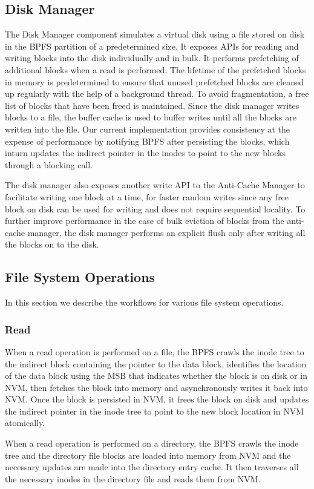 \subsection{Disk Manager}
The Disk Manager component simulates a virtual disk using a file stored on disk in the BPFS partition of a predetermined size. It exposes APIs for reading and writing blocks into the disk individually and in bulk. It performs prefetching of additional blocks when a read is performed. The lifetime of the prefetched blocks in memory is predetermined to ensure that unused prefetched blocks are cleaned up regularly with the help of a background thread. To avoid fragmentation, a free list of blocks that have been freed is maintained. Since the disk manager writes blocks to a file, the buffer cache is used to buffer writes until all the blocks are written into the file. Our current implementation provides consistency at the expense of performance by notifying BPFS after persisting the blocks, which inturn updates the indirect pointer in the inodes to point to the new blocks through a blocking call.

The disk manager also exposes another write API to the Anti-Cache Manager to facilitate writing one block at a time, for faster random writes since any free block on disk can be used for writing and does not require sequential locality. To further improve performance in the case of bulk eviction of blocks from the anti-cache manager, the disk manager performs an explicit flush only after writing all the blocks on to the disk.

\subsection{File System Operations}
In this section we describe the workflows for various file system operations.
\subsubsection{Read}
When a read operation is performed on a file, the BPFS crawls the inode tree to the indirect block containing the pointer to the data block, identifies the location of the data block using the MSB that indicates whether the block is on disk or in NVM, then fetches the block into memory and asynchronously writes it back into NVM. Once the block is persisted in NVM, it frees the block on disk and updates the indirect pointer in the inode tree to point to the new block location in NVM atomically.

When a read operation is performed on a directory, the BPFS crawls the inode tree and the directory file blocks are loaded into memory from NVM and the necessary updates are made into the directory entry cache. It then traverses all the necessary inodes in the directory file and reads them from NVM.

